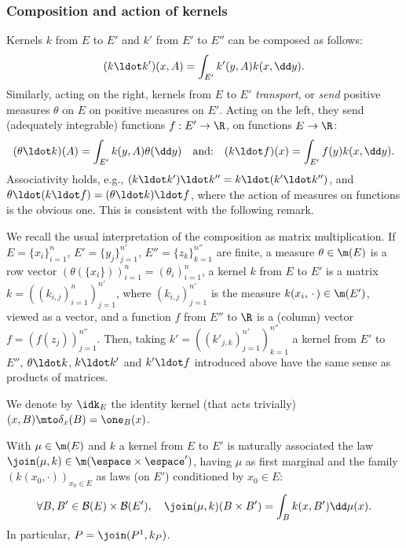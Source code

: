 \subsubsection{Composition and action of kernels}\label{ss:compos} Kernels $k$ from $E$ to $E'$ and $k'$ from $E'$ to $E''$ can be composed as follows:\vspace*{-3pt}
\[(k\ldot k')(x,A)=\int_{E'} k'(y,A) k(x,\dd y).\]
Similarly, acting on the right, kernels from $E$ to $E'$ \emph{transport}, or \emph{send} positive measures $\theta$ on $E$ on positive measures on $E'$. Acting on the left, they send (adequately integrable) functions $f:E'\to \R$, on functions $E\to \R$:\vspace*{-3pt}
\[(\theta\ldot k)(A)=\int_{E'}k(y,A)\theta(\dd y)\quad \text{and:}\quad (k\ldot f)(x)=\int_{E'} f(y) k(x,\dd y).\]
\noindent Associativity holds, e.g., $(k\ldot k')\ldot k''=k\ldot(k'\ldot k'')$, and $\theta\ldot(k\ldot f)=(\theta\ldot k)\ldot f$, where the action of measures on functions is the obvious one. This is consistent with the following remark.

\begin{rem}\label{rem:matrix}
We recall the usual interpretation of the composition as matrix multiplication. If $E=\{x_i\}_{i=1}^{n}$, $E'=\{y_j\}_{j=1}^{n'}$, $E''=\{z_k\}_{k=1}^{n''}$ are finite, a measure $\theta\in\m(E)$ is a row vector $(\theta(\{x_i\}))_{i=1}^{n}=(\theta_i)_{i=1}^{n}$, a kernel $k$ from $E$ to $E'$ is a matrix $k=((k_{i,j})_{i=1}^{n})_{j=1}^{n'}$, where $(k_{i,j})_{j=1}^{n'}$ is the measure $k(x_i,\,\cdot\,)\in\m(E')$, viewed as a vector, and a function $f$ from $E''$ to $\R$ is a (column) vector $f=(f(z_j))_{j=1}^{n''}$. Then, taking $k'=((k'_{j,k})_{j=1}^{n'})_{k=1}^{n''}$ a kernel from $E'$ to $E''$, $\theta\ldot k$, $k\ldot k'$ and $k'\ldot f$ introduced above have the same sense as products of matrices.
\end{rem}

\begin{notation}\label{not:ident} We denote by $\idk_E$ the identity kernel (that acts trivially) $(x,B)\mto\delta_x(B)=\one_B(x)$.
\end{notation}

\begin{notation}\label{notation_join} With $\mu\in\m(E)$ and $k$ a kernel from $E$ to $E'$ is naturally associated the law $\join(\mu,k)\in\m(\espace\times \espace')$, having $\mu$ as first marginal and the family $(k(x_0,\cdot))_{x_0\in E}$ as laws (on $E'$) conditioned by $x_0\in E$:\vspace*{-3pt}
\[\forall B,B'\in{\mathcal B}(E)\times{\mathcal B}(E'),\quad \join(\mu,k)(B\times B')=\int_Bk(x,B')\dd\mu(x).\]
In particular, $P=\join(P^1,k_P)$.
\end{notation}

